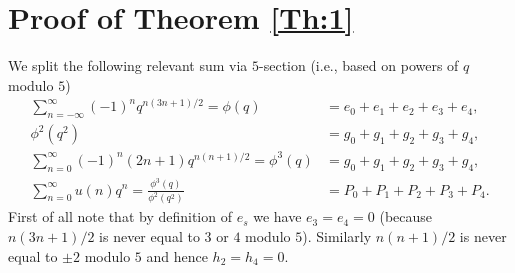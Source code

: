 \documentclass{article}
\begin{document}
\section{Proof of Theorem \ref{Th:1}} \label{S2}
We split the following relevant sum via $5$-section (i.e., based on powers of $q$ modulo $5$)
\begin{align*}
 \sum_{n = -\infty}^{\infty}(-1)^{n}q^{n(3n + 1)/2} =\phi(q) &=  e_{0} + e_{1} + e_{2} + e_{3} + e_{4}, \\
\phi^2(q^2) &= g_{0} + g_{1} + g_{2} + g_{3} + g_{4}, \\
 \sum_{n = 0}^{\infty}(-1)^{n}(2n + 1)q^{n(n + 1)/2} = \phi^{3}(q) &=   g_{0} + g_{1} + g_{2} + g_{3} + g_{4}, \\
 \sum_{n = 0}^{\infty}u(n)q^{n} = \frac{\phi^3(q)}{\phi^2(q^2)} &=  P_{0} + P_{1} + P_{2} + P_{3} + P_{4}.
\end{align*}
First of all note that by definition of $e_{s}$ we have $e_{3} = e_{4} = 0$ (because $n(3n + 1)/2$ is 
never equal to $3$ or $4$ modulo $5$). Similarly $n(n + 1)/2$ is never equal to $\pm 2$ modulo $5$ and hence $h_{2}= h_{4}= 0$. 
\end{document}
